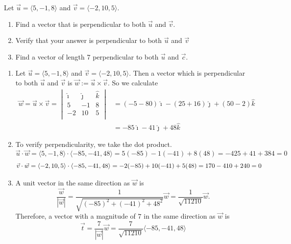\documentclass[noinstructornotes]{ximera}
\begin{document}
\begin{problem} 
Let $\vec{u} =\langle 5,-1,8 \rangle$ and $\vec{v} = \langle -2,10,5 \rangle$.
\begin{enumerate}
\item Find a vector that is perpendicular to both $\vec{u}$ and $\vec{v}$.  
\item Verify that your answer is perpendicular to both $\vec{u}$ and $\vec{v}$
\item Find a vector of length 7 perpendicular to both $\vec{u}$ and $\vec{c}$.
\end{enumerate}

	\begin{freeResponse}
	\begin{enumerate}
	\item 
	Let $\vec{u} = \langle 5,-1,8 \rangle$ and $\vec{v} = \langle -2,10,5 \rangle$.
	Then a vector which is perpendicular to both $\vec{u}$ and $\vec{v}$ is $\vec{w} := \vec{u} \times \vec{v}$.  
	So we calculate
		\begin{align*}
		\vec{w} = \vec{u} \times \vec{v} = 
		\begin{vmatrix}
		\hat{\imath}	&	\hat{\jmath}	&	\hat{k}	\\
		5		&	-1		&	8		\\
		-2		&	10		&	5		\\
		\end{vmatrix}
		&= (-5 - 80) \hat{\imath} - (25 + 16) \hat{\jmath} + (50 - 2) \hat{k}  \\
		&= -85 \hat{\imath} -41 \hat{\jmath} + 48 \hat{k}
		\end{align*}
		
	\item To verify perpendicularity, we take the dot product.\\
	\[
	\vec{u} \cdot \vec{w} = \langle 5,-1,8 \rangle \cdot \langle -85, -41, 48 \rangle = 5(-85)-1(-41)+8(48) = -425 +41 + 384 = 0 
	\]
	\[
	\vec{v} \cdot \vec{w} = \langle -2,10,5 \rangle \cdot \langle -85, -41, 48 \rangle = -2(-85) +10(-41)+5(48) = 170 -410 + 240 = 0 \\
	\]	
		
	\item	
	A unit vector in the same direction as $\vec{w}$ is
		\[
		\frac{\vec{w}}{| \vec{w} |}
		= \frac{1}{\sqrt{(-85)^2 + (-41)^2 + 48^2}} \vec{w} = \frac{1}{\sqrt{11210}} \vec{w}.
		\]
	Therefore, a vector with a magnitude of $7$ in the same direction as $\vec{w}$ is
		\[
		\vec{t} = \frac{7}{| \vec{w} |} \vec{w} = \boxed{\frac{7}{\sqrt{11210}} \langle -85,-41,48 \rangle}
		\]
		
		\end{enumerate}
		
	\end{freeResponse}
		
\end{problem}
\end{document}
